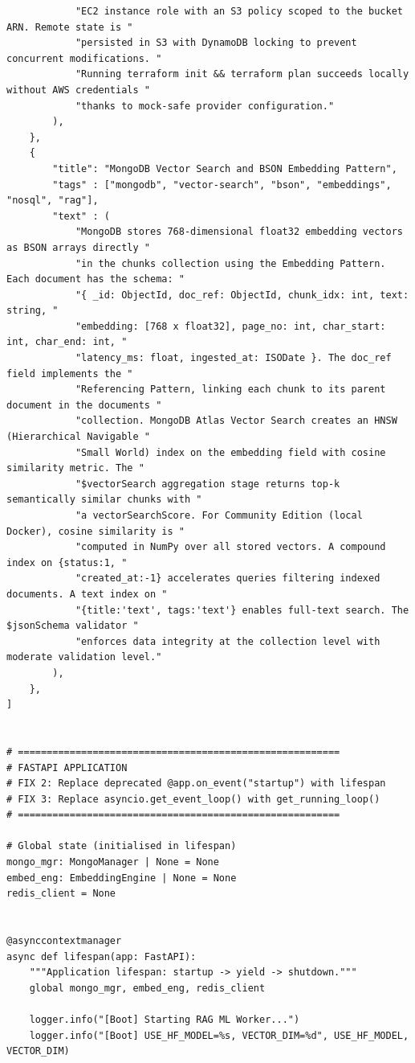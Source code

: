 \documentclass[12pt,a4paper]{report}
\begin{document}
\begin{lstlisting}
            "EC2 instance role with an S3 policy scoped to the bucket ARN. Remote state is "
            "persisted in S3 with DynamoDB locking to prevent concurrent modifications. "
            "Running terraform init && terraform plan succeeds locally without AWS credentials "
            "thanks to mock-safe provider configuration."
        ),
    },
    {
        "title": "MongoDB Vector Search and BSON Embedding Pattern",
        "tags" : ["mongodb", "vector-search", "bson", "embeddings", "nosql", "rag"],
        "text" : (
            "MongoDB stores 768-dimensional float32 embedding vectors as BSON arrays directly "
            "in the chunks collection using the Embedding Pattern. Each document has the schema: "
            "{ _id: ObjectId, doc_ref: ObjectId, chunk_idx: int, text: string, "
            "embedding: [768 x float32], page_no: int, char_start: int, char_end: int, "
            "latency_ms: float, ingested_at: ISODate }. The doc_ref field implements the "
            "Referencing Pattern, linking each chunk to its parent document in the documents "
            "collection. MongoDB Atlas Vector Search creates an HNSW (Hierarchical Navigable "
            "Small World) index on the embedding field with cosine similarity metric. The "
            "$vectorSearch aggregation stage returns top-k semantically similar chunks with "
            "a vectorSearchScore. For Community Edition (local Docker), cosine similarity is "
            "computed in NumPy over all stored vectors. A compound index on {status:1, "
            "created_at:-1} accelerates queries filtering indexed documents. A text index on "
            "{title:'text', tags:'text'} enables full-text search. The $jsonSchema validator "
            "enforces data integrity at the collection level with moderate validation level."
        ),
    },
]


# ========================================================
# FASTAPI APPLICATION
# FIX 2: Replace deprecated @app.on_event("startup") with lifespan
# FIX 3: Replace asyncio.get_event_loop() with get_running_loop()
# ========================================================

# Global state (initialised in lifespan)
mongo_mgr: MongoManager | None = None
embed_eng: EmbeddingEngine | None = None
redis_client = None


@asynccontextmanager
async def lifespan(app: FastAPI):
    """Application lifespan: startup -> yield -> shutdown."""
    global mongo_mgr, embed_eng, redis_client

    logger.info("[Boot] Starting RAG ML Worker...")
    logger.info("[Boot] USE_HF_MODEL=%s, VECTOR_DIM=%d", USE_HF_MODEL, VECTOR_DIM)


\end{lstlisting}
\end{document}
